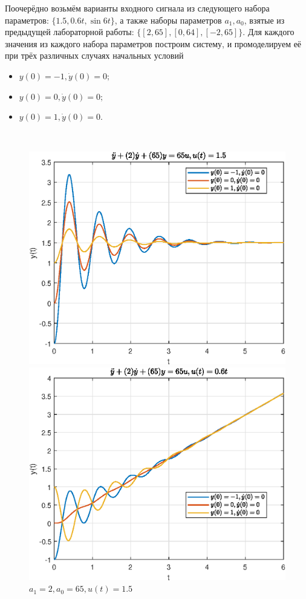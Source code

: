 \documentclass[a4paper]{article}
\begin{document}
Поочерёдно возьмём варианты входного сигнала из следующего набора параметров: $\{1.5, 0.6t, \sin{6t}\}$, а также наборы параметров $a_1, a_0$, взятые из предыдущей лабораторной работы: $\{[2, 65], [0, 64], [-2, 65]\}$. Для каждого значения из каждого набора параметров построим систему, и промоделируем её при трёх различных случаях начальных условий\

\begin{itemize}
    \item $y(0) = -1, \dot{y}(0) = 0;$
    \item $y(0) = 0, \dot{y}(0) = 0;$
    \item $y(0) = 1, \dot{y}(0) = 0.$
\end{itemize}\ 

\begin{figure}[H]
    \begin{minipage}{0.5\textwidth}
        \centering \includegraphics[width=\textwidth]{ex1/1.5_2_65}
        \caption{$a_1 = 2, a_0 = 65, u(t) = 1.5$}
    \end{minipage}\hfill
    \begin{minipage}{0.5\textwidth}
        \centering \includegraphics[width=\textwidth]{ex1/0.6t_2_65}

\end{minipage}
\end{figure}
\end{document}
